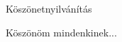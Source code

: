\documentclass[a4paper, oneside, 12pt]{memoir}
\begin{document}
\newpage

\begin{SingleSpace}
\printbibliography[title={Irodalom}]
\end{SingleSpace}

\newpage

\vspace*{0.5cm}
\begin{center}
\huge
Köszönetnyilvánítás
\end{center}
\vspace{1cm}
Köszönöm mindenkinek...
\end{document}

